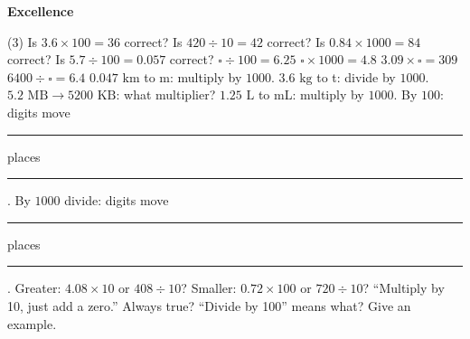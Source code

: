 \documentclass[17pt,a4paper,landscape]{extarticle}
\begin{document}
\sffamily
\boldmath

\boldmath

\boldmath

\boldmath

\vspace*{0.4em}
{\LARGE \textbf{Excellence}}
\begin{tasks}(3)
\task Is \mbox{$3.6 \times 100 = 36$} correct?
\task Is \mbox{$420 \div 10 = 42$} correct?
\task Is \mbox{$0.84 \times 1000 = 84$} correct?
\task Is \mbox{$5.7 \div 100 = 0.057$} correct?
\task \mbox{$\square \div 100 = 6.25$}
\task \mbox{$\square \times 1000 = 4.8$}
\task \mbox{$3.09 \times \square = 309$}
\task \mbox{$6400 \div \square = 6.4$}
\task \mbox{$0.047\text{ km}$} to m: multiply by \mbox{$1000$}.
\task \mbox{$3.6\text{ kg}$} to t: divide by \mbox{$1000$}.
\task \mbox{$5.2\text{ MB} \to 5200\text{ KB}$}: what multiplier?
\task \mbox{$1.25\text{ L}$} to mL: multiply by \mbox{$1000$}.
\task By \mbox{$100$}: digits move \rule{1.4cm}{0.15mm} places \rule{1.4cm}{0.15mm}.
\task By \mbox{$1000$} divide: digits move \rule{1.4cm}{0.15mm} places \rule{1.4cm}{0.15mm}.
\task Greater: \mbox{$4.08 \times 10$} or \mbox{$408 \div 10$}?
\task Smaller: \mbox{$0.72 \times 100$} or \mbox{$720 \div 10$}?
\task “Multiply by 10, just add a zero.” Always true?
\task “Divide by 100” means what? Give an example.
\end{tasks}
\end{document}
